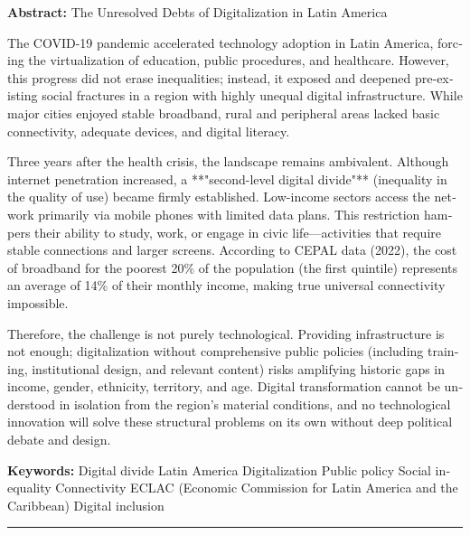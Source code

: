 \documentclass{article}
\begin{document}
\begin{tcolorbox}[colback=brown!8!white,colframe=brown!8!white,boxrule=0pt,arc=2pt,left=4pt,right=4pt,top=3pt,bottom=3pt,before skip=4pt,after skip=4pt]
\begin{otherlanguage}{english}
\sffamily\small \textbf{Abstract:} The Unresolved Debts of Digitalization in Latin America

The COVID-19 pandemic accelerated technology adoption in Latin America, forcing the virtualization of education, public procedures, and healthcare. However, this progress did not erase inequalities; instead, it exposed and deepened pre-existing social fractures in a region with highly unequal digital infrastructure. While major cities enjoyed stable broadband, rural and peripheral areas lacked basic connectivity, adequate devices, and digital literacy.

Three years after the health crisis, the landscape remains ambivalent. Although internet penetration increased, a **"second-level digital divide"** (inequality in the quality of use) became firmly established. Low-income sectors access the network primarily via mobile phones with limited data plans. This restriction hampers their ability to study, work, or engage in civic life—activities that require stable connections and larger screens. According to CEPAL data (2022), the cost of broadband for the poorest 20\% of the population (the first quintile) represents an average of 14\% of their monthly income, making true universal connectivity impossible.

Therefore, the challenge is not purely technological. Providing infrastructure is not enough; digitalization without comprehensive public policies (including training, institutional design, and relevant content) risks amplifying historic gaps in income, gender, ethnicity, territory, and age. Digital transformation cannot be understood in isolation from the region's material conditions, and no technological innovation will solve these structural problems on its own without deep political debate and design.
\par\smallskip\noindent\textbf{Keywords:} Digital divide Latin America Digitalization Public policy Social inequality Connectivity ECLAC (Economic Commission for Latin America and the Caribbean) Digital inclusion
\end{otherlanguage}
\end{tcolorbox}

\bigskip
\noindent\rule{\linewidth}{0.4pt}
\bigskip
\end{document}
